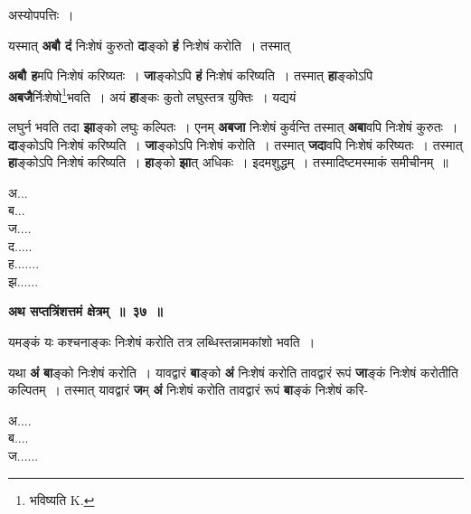 \documentclass[11pt, openany]{book}
\begin{document}
\begin{center}
अस्योपपत्तिः~।
\end{center}

 यस्मात् \textbf{अबौ दं} निःशेषं कुरुतो \textbf{दा}ङ्को \textbf{हं} निःशेषं करोति~। तस्मात् 

\newpage

\noindent \textbf{अबौ ह}मपि निःशेषं करिष्यतः~। \textbf{जा}ङ्कोऽपि \textbf{हं} निःशेषं करिष्यति~। तस्मात् \textbf{हा}ङ्कोऽपि \textbf{अबजै}र्निःशेषो\;\renewcommand{\thefootnote}{१}\footnote{भविष्यति {\en K.}}भवति~। अयं \textbf{हा}ङ्कः कुतो लघुस्तत्र युक्तिः~। यद्ययं
\vspace{-4mm}

\begin{flushleft}
\begin{minipage}[t]{0.75\textwidth}
 लघुर्न भवति तदा \textbf{झा}ङ्को लघुः कल्पितः~। एनम् \textbf{अबजा} निःशेषं कुर्वन्ति तस्मात् \textbf{अबा}वपि निःशेषं कुरुतः~। \textbf{दा}ङ्कोऽपि निःशेषं करिष्यति~। \textbf{जा}ङ्कोऽपि निःशेषं करोति~। तस्मात् \textbf{जदा}वपि निःशेषं करिष्यतः~। तस्मात् \textbf{हा}ङ्कोऽपि निःशेषं करिष्यति~। \textbf{हा}ङ्को \textbf{झा}त् अधिकः~। इदमशुद्धम्~। तस्मादिष्टमस्माकं समीचीनम्~॥
\end{minipage} 
\hfill
\begin{minipage}[t]{0.15\textwidth}
\vspace{-6mm}

अ... \\
ब... \\
ज....\\
द..... \\
ह.......\\
झ......
\end{minipage}
\end{flushleft}
\vspace{-2mm}

\begin{center}
\textbf{\large अथ सप्तत्रिंशत्तमं क्षेत्रम्~॥~३७~॥}
\end{center}

{\ab यमङ्कं यः कश्चनाङ्कः निःशेषं करोति तत्र लब्धिस्तन्नामकांशो भवति~। }

\begin{flushleft}
\begin{minipage}[t]{0.77\textwidth}
\hspace{4mm} यथा \textbf{अं} \textbf{बा}ङ्को निःशेषं करोति~। यावद्वारं \textbf{बा}ङ्को \textbf{अं} निःशेषं करोति तावद्वारं रूपं \textbf{जा}ङ्कं निःशेषं करोतीति कल्पितम्~। तस्मात् यावद्वारं \textbf{ज}म् \textbf{अं} निःशेषं करोति तावद्वारं रूपं \textbf{बा}ङ्कं निःशेषं करि-
\end{minipage} 
\hfill
\begin{minipage}[t]{0.13\textwidth}
अ....\\
ब.... \\
ज......
\end{minipage}
\end{flushleft}
\vspace{-3mm}
\end{document}

